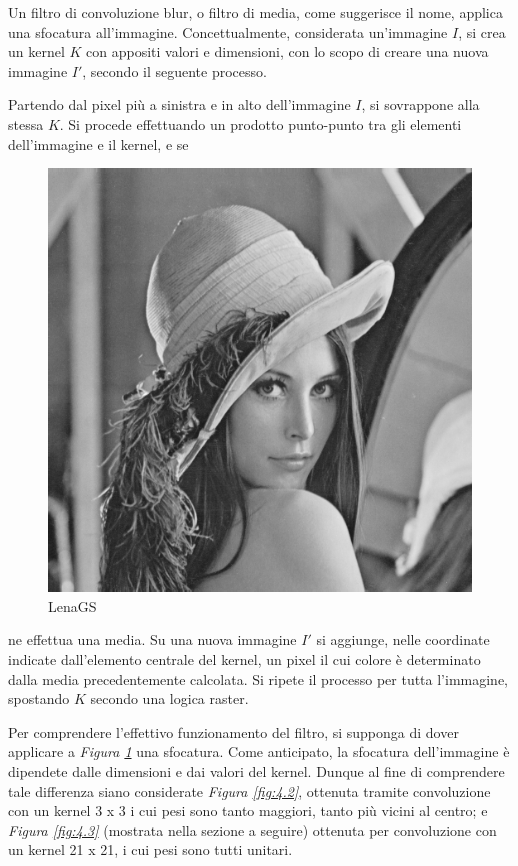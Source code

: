 \documentclass{subfiles}
\begin{document}
Un filtro di convoluzione blur, o filtro di media, come suggerisce il nome, applica una sfocatura all'immagine.
Concettualmente, considerata un'immagine \(I\), si crea un kernel \(K\) con appositi valori e dimensioni, con lo scopo di creare una nuova immagine \(I'\),
secondo il seguente processo.

Partendo dal pixel più a sinistra e in alto dell'immagine \(I\), si sovrappone alla stessa \(K\).
Si procede effettuando un prodotto punto-punto tra gli elementi dell'immagine e il kernel, e se
\begin{figure}
    \centering
    \includegraphics[scale = 0.3]{../Images/Lena/LenaGS.png}
    \caption{LenaGS}
    \label{fig:4.1}
\end{figure}
ne effettua una media.
Su una nuova immagine \(I'\) si aggiunge, nelle coordinate indicate dall'elemento centrale del kernel,
un pixel il cui colore è determinato dalla media precedentemente calcolata.
Si ripete il processo per tutta l'immagine, spostando \(K\) secondo una logica raster.

Per comprendere l'effettivo funzionamento del filtro, si supponga di dover applicare a \emph{Figura \ref{fig:4.1}} una sfocatura.
Come anticipato, la sfocatura dell'immagine è dipendete dalle dimensioni e dai valori del kernel.
Dunque al fine di comprendere tale differenza siano considerate \emph{Figura \ref{fig:4.2}}, ottenuta tramite convoluzione con un kernel 3 x 3 i cui pesi sono tanto maggiori,
tanto più vicini al centro; e \emph{Figura \ref{fig:4.3}} (mostrata nella sezione a seguire) ottenuta per convoluzione con un kernel 21 x 21, i cui pesi sono tutti unitari.
\end{document}

